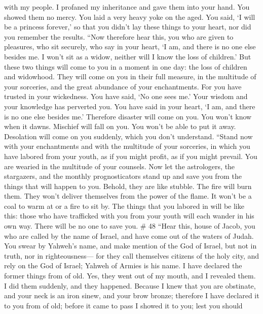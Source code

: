 with my people. I profaned my inheritance and gave them into your hand.
You showed them no mercy. You laid a very heavy yoke on the aged.
 You said, `I will be a princess forever,' so that you
didn't lay these things to your heart, nor did you remember the results.
 ``Now therefore hear this, you who are given to pleasures,
who sit securely, who say in your heart, `I am, and there is no one else
besides me. I won't sit as a widow, neither will I know the loss of
children.'  But these two things will come to you in a
moment in one day: the loss of children and widowhood. They will come on
you in their full measure, in the multitude of your sorceries, and the
great abundance of your enchantments.  For you have trusted
in your wickedness. You have said, `No one sees me.' Your wisdom and
your knowledge has perverted you. You have said in your heart, `I am,
and there is no one else besides me.'  Therefore disaster
will come on you. You won't know when it dawns. Mischief will fall on
you. You won't be able to put it away. Desolation will come on you
suddenly, which you don't understand.  ``Stand now with
your enchantments and with the multitude of your sorceries, in which you
have labored from your youth, as if you might profit, as if you might
prevail.  You are wearied in the multitude of your
counsels. Now let the astrologers, the stargazers, and the monthly
prognosticators stand up and save you from the things that will happen
to you.  Behold, they are like stubble. The fire will burn
them. They won't deliver themselves from the power of the flame. It
won't be a coal to warm at or a fire to sit by.  The things
that you labored in will be like this: those who have trafficked with
you from your youth will each wander in his own way. There will be no
one to save you. \# 48  ``Hear this, house of Jacob, you who
are called by the name of Israel, and have come out of the waters of
Judah. You swear by Yahweh's name, and make mention of the God of
Israel, but not in truth, nor in righteousness---  for they
call themselves citizens of the holy city, and rely on the God of
Israel; Yahweh of Armies is his name.  I have declared the
former things from of old. Yes, they went out of my mouth, and I
revealed them. I did them suddenly, and they happened. 
Because I knew that you are obstinate, and your neck is an iron sinew,
and your brow bronze;  therefore I have declared it to you
from of old; before it came to pass I showed it to you; lest you should
